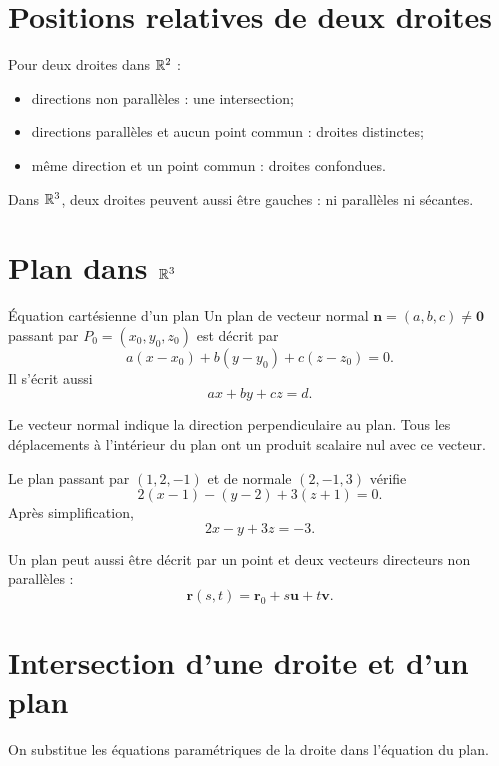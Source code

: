 \section{Positions relatives de deux droites}
\label{manual:section:10.03}

Pour deux droites dans $\mathbb{R}^2$ :
\begin{itemize}
\item directions non parallèles : une intersection;
\item directions parallèles et aucun point commun : droites distinctes;
\item même direction et un point commun : droites confondues.
\end{itemize}
Dans $\mathbb{R}^3$, deux droites peuvent aussi être gauches : ni parallèles ni sécantes.

\section{Plan dans \texorpdfstring{$\mathbb{R}^3$}{R3}}
\label{manual:section:10.04}

\begin{definition}{Équation cartésienne d'un plan}{}
Un plan de vecteur normal $\mathbf n=(a,b,c)\neq\mathbf0$ passant par $P_0=(x_0,y_0,z_0)$ est décrit par
\[
a(x-x_0)+b(y-y_0)+c(z-z_0)=0.
\]
Il s'écrit aussi
\[
ax+by+cz=d.
\]
\end{definition}

\begin{intuitionbox}
Le vecteur normal indique la direction perpendiculaire au plan. Tous les déplacements à l'intérieur du plan ont un produit scalaire nul avec ce vecteur.
\end{intuitionbox}

\begin{examplebox}
Le plan passant par $(1,2,-1)$ et de normale $(2,-1,3)$ vérifie
\[
2(x-1)-(y-2)+3(z+1)=0.
\]
Après simplification,
\[
2x-y+3z=-3.
\]
\end{examplebox}

Un plan peut aussi être décrit par un point et deux vecteurs directeurs non parallèles :
\[
\mathbf r(s,t)=\mathbf r_0+s\mathbf u+t\mathbf v.
\]

\section{Intersection d'une droite et d'un plan}
\label{manual:section:10.05}

On substitue les équations paramétriques de la droite dans l'équation du plan.


